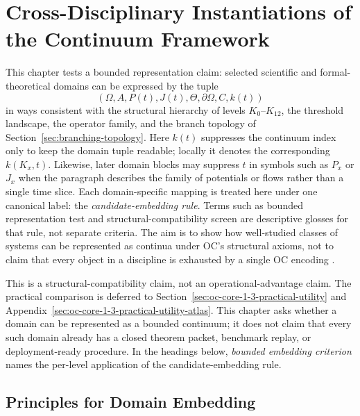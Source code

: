 
\section{Cross-Disciplinary Instantiations of the Continuum Framework}
\label{sec:disciplines-extended}

This chapter tests a bounded representation claim: selected scientific and
formal-theoretical domains can be expressed by the tuple
\[
  (\Omega, A, P(t), J(t), \Theta, \partial\Omega, C, k(t))
\]
in ways consistent with the structural hierarchy of levels
\(K_0\)–\(K_{12}\), the threshold landscape, the operator family, and the
branch topology of Section~\ref{sec:branching-topology}.  
Here \(k(t)\) suppresses the continuum index only to keep the domain tuple
readable; locally it denotes the corresponding \(k(K_x,t)\).
Likewise, later domain blocks may suppress \(t\) in symbols such as \(P_x\)
or \(J_x\) when the paragraph describes the family of potentials or flows
rather than a single time slice.
Each domain-specific mapping is treated here under one canonical label: the
\emph{candidate-embedding rule}. Terms such as bounded representation test and
structural-compatibility screen are descriptive glosses for that rule, not
separate criteria. The aim is to show how well-studied classes of systems can
be represented as continua under OC's structural axioms, not to claim that
every object in a discipline is exhausted by a single OC encoding
\parencite{anderson_more_is_different}.

This is a structural-compatibility claim, not an operational-advantage claim.
The practical comparison is deferred to
Section~\ref{sec:oc-core-1-3-practical-utility} and
Appendix~\ref{sec:oc-core-1-3-practical-utility-atlas}. This chapter asks
whether a domain can be represented as a bounded continuum; it does not claim
that every such domain already has a closed theorem packet, benchmark replay,
or deployment-ready procedure. In the headings below, \emph{bounded embedding
criterion} names the per-level application of the candidate-embedding rule.

\subsection{Principles for Domain Embedding}

